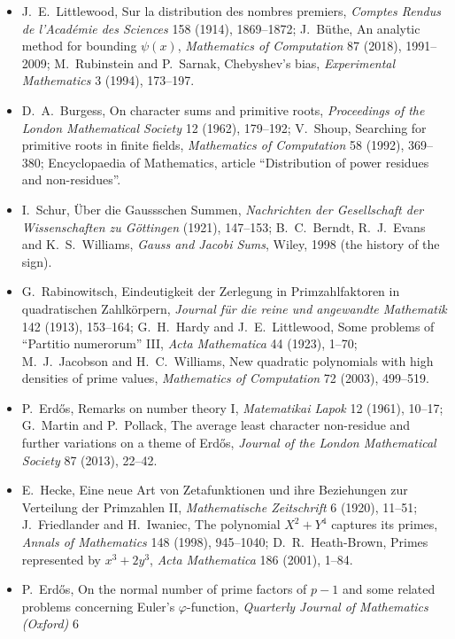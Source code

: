 \begin{itemize}
théorie des nombres premiers, \emph{Communications du Séminaire Mathématique de l'Université de Lund}, volume supplémentaire (1952), 252--265.
\item J.~E.~Littlewood, Sur la distribution des nombres premiers, \emph{Comptes Rendus de l'Académie des Sciences} 158 (1914), 1869--1872; J.~Büthe, An analytic method for bounding
$\psi(x)$, \emph{Mathematics of Computation} 87 (2018), 1991--2009; M.~Rubinstein and P.~Sarnak, Chebyshev's bias, \emph{Experimental Mathematics} 3 (1994), 173--197.
\item D.~A.~Burgess, On character sums and primitive roots, \emph{Proceedings of the London Mathematical Society} 12 (1962), 179--192; V.~Shoup, Searching for primitive roots in finite
fields, \emph{Mathematics of Computation} 58 (1992), 369--380; Encyclopaedia of Mathematics, article ``Distribution of power residues and non-residues''.
\item I.~Schur, Über die Gaussschen Summen, \emph{Nachrichten der Gesellschaft der Wissenschaften zu Göttingen} (1921), 147--153; B.~C.~Berndt, R.~J.~Evans and K.~S.~Williams, \emph{Gauss
and Jacobi Sums}, Wiley, 1998 (the history of the sign).
\item G.~Rabinowitsch, Eindeutigkeit der Zerlegung in Primzahlfaktoren in quadratischen Zahlkörpern, \emph{Journal für die reine und angewandte Mathematik} 142 (1913), 153--164;
G.~H.~Hardy and J.~E.~Littlewood, Some problems of ``Partitio numerorum'' III, \emph{Acta Mathematica} 44 (1923), 1--70; M.~J.~Jacobson and H.~C.~Williams, New quadratic polynomials
with high densities of prime values, \emph{Mathematics of Computation} 72 (2003), 499--519.
\item P.~Erd\H os, Remarks on number theory I, \emph{Matematikai Lapok} 12 (1961), 10--17; G.~Martin and P.~Pollack, The average least character non-residue and further variations on a
theme of Erd\H os, \emph{Journal of the London Mathematical Society} 87 (2013), 22--42.
\item E.~Hecke, Eine neue Art von Zetafunktionen und ihre Beziehungen zur Verteilung der Primzahlen II, \emph{Mathematische Zeitschrift} 6 (1920), 11--51; J.~Friedlander and H.~Iwaniec,
The polynomial $X^2+Y^4$ captures its primes, \emph{Annals of Mathematics} 148 (1998), 945--1040; D.~R.~Heath-Brown, Primes represented by $x^3+2y^3$, \emph{Acta Mathematica} 186 (2001),
1--84.
\item P.~Erd\H os, On the normal number of prime factors of $p-1$ and some related problems concerning Euler's $\varphi$-function, \emph{Quarterly Journal of Mathematics (Oxford)} 6

\end{itemize}
